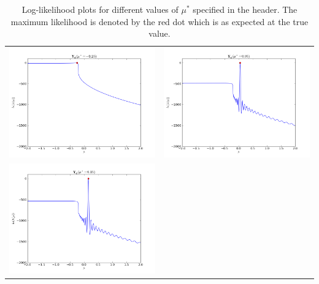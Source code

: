 \begin{table}[ht]
\begin{tabular}{cc}
\includegraphics[scale=0.3]{likelihood_snic025m}&\includegraphics[scale=0.3]{likelihood_snic005}\\
\newline
\includegraphics[scale=0.3]{likelihood_snic015}
\end{tabular}
\caption{Log-likelihood plots for different values of $\mu^*$ specified in the header. The maximum likelihood is denoted by the red dot which is as expected at the true value.}
\label{fig:snic}
\end{table}

